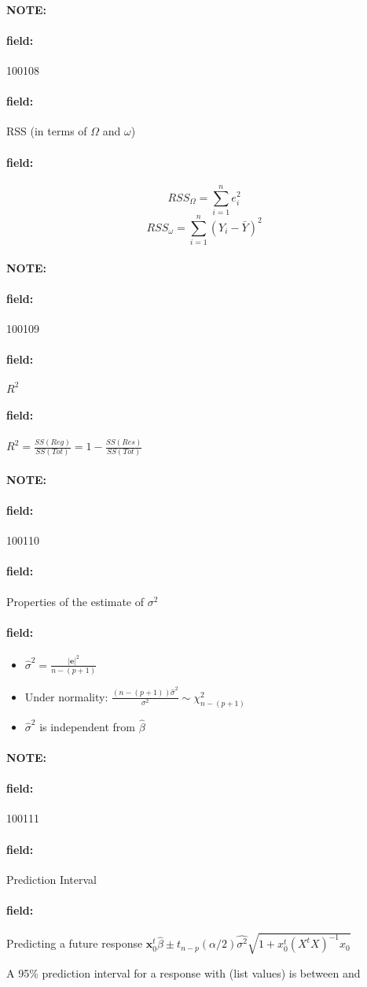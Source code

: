 \documentclass[12pt]{article}
\newenvironment{note}{\paragraph{NOTE:}}{}
\newenvironment{field}{\paragraph{field:}}{}
\begin{document}
\begin{note} \begin{field} \tiny 100108 \end{field}
  \begin{field}
    RSS (in terms of $\Omega$ and $\omega$)
  \end{field}
  \begin{field}
    $$RSS_\Omega = \sum_{i=1}^n e_i^2$$
    $$RSS_\omega = \sum_{i=1}^n (Y_i - \bar{Y})^2$$
  \end{field}
\end{note}


\begin{note} \begin{field} \tiny 100109 \end{field}
  \begin{field}
    $R^2$
  \end{field}
  \begin{field}
    $R^2 = \frac{SS(Reg)}{SS(Tot)} = 1 - \frac{SS(Res)}{SS(Tot)}$
  \end{field}
\end{note}



\begin{note} \begin{field} \tiny 100110 \end{field}
  \begin{field}
    Properties of the estimate of $\sigma^2$
  \end{field}
  \begin{field}
    \begin{itemize}
      \item   $\hat{\sigma}^2 = \frac{|\mathbf{e}|^2}{n - (p+1)}$
      \item Under normality: $\frac{(n - (p+1))\hat{\sigma}^2}{\sigma^2} \sim \chi^2_{n - (p+1)}$
      \item $\hat{\sigma}^2$ is independent from $\hat{\beta}$
    \end{itemize}
  \end{field}
\end{note}


\begin{note} \begin{field} \tiny 100111 \end{field}
  \begin{field}
    Prediction Interval
  \end{field}
  \begin{field}
    Predicting a future response
    $\mathbf{x}_0^t \hat{\beta} \pm t_{n-p}(\alpha/2)\hat{\sigma^2} \sqrt{1 + x_0^t(X^tX)^{-1}x_0}$

    A 95\% prediction interval for a response with (list values) is between and
  \end{field}
\end{note}
\end{document}
